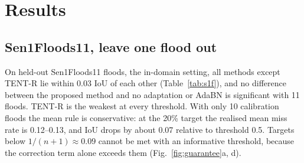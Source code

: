\documentclass[a4paper,fleqn]{cas-sc}
\begin{document}
\section{Results}
\label{sec:results}

\subsection{Sen1Floods11, leave one flood out}
On held-out Sen1Floods11 floods, the in-domain setting, all methods except TENT-R lie within 0.03 IoU of each other (Table~\ref{tab:s1f}), and no difference between the proposed method and no adaptation or AdaBN is significant with 11 floods. TENT-R is the weakest at every threshold. With only 10 calibration floods the mean rule is conservative: at the 20\% target the realised mean miss rate is 0.12--0.13, and IoU drops by about 0.07 relative to threshold 0.5. Targets below $1/(n+1)\approx0.09$ cannot be met with an informative threshold, because the correction term alone exceeds them (Fig.~\ref{fig:guarantee}a, d).

\begin{table}[t]
\caption{Sen1Floods11, leave one flood out (11 floods, radar only): mean IoU at threshold 0.5, under the mean rule (Eq.~\ref{eq:mean}) and under the per-flood rule (Eq.~\ref{eq:flood}), with the number of floods that meet the 20\% target under the per-flood rule. Best value per column in bold.}
\label{tab:s1f}
\centering
\small

\end{table}
\end{document}
